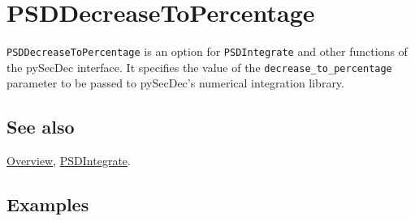 \documentclass[../FeynHelpersManual.tex]{subfiles}
\begin{document}
\hypertarget{psddecreasetopercentage}{
\section{PSDDecreaseToPercentage}\label{psddecreasetopercentage}}

\texttt{PSDDecreaseToPercentage} is an option for \texttt{PSDIntegrate}
and other functions of the pySecDec interface. It specifies the value of
the \texttt{decrease_to_percentage} parameter to be passed to pySecDec's
numerical integration library.

\subsection{See also}

\hyperlink{toc}{Overview}, \hyperlink{psdintegrate}{PSDIntegrate}.

\subsection{Examples}
\end{document}
